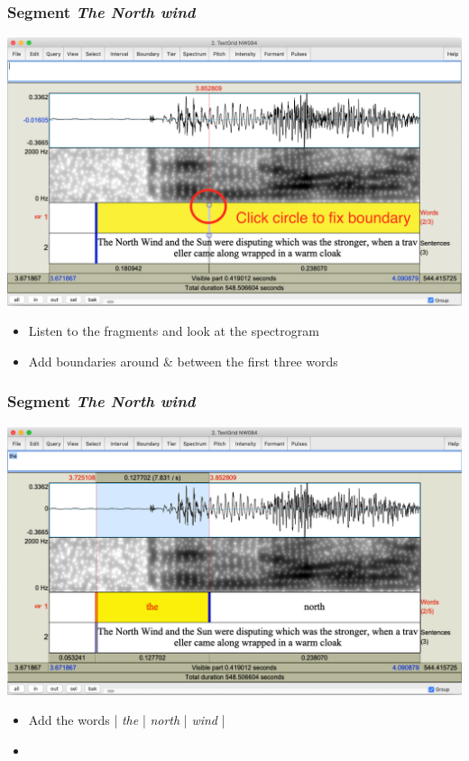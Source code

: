 \documentclass{beamer}
\begin{document}
\begin{frame} 
\frametitle{Segment \textit{The North wind}} 

\includegraphics[width=0.95\framewidth]{img/Words_adding_boundary}

\begin{itemize} 
\item Listen to the fragments and look at the spectrogram
\item Add boundaries around \& between the first three words
\end{itemize}
\end{frame}

\begin{frame} 
\frametitle{Segment \textit{The North wind}} 

\includegraphics[width=0.95\framewidth]{img/Words_segmenting}

\begin{itemize} 
\item Add the words | \textit{the} | \textit{north} | \textit{wind} |
\item[ ]
\end{itemize}
\end{frame}
\end{document}
